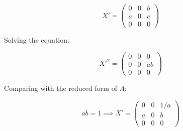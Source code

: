 \documentclass[11pt]{article}
\begin{document}
\begin{equation}
    X' = \begin{pmatrix} 0 & 0 & b  \\ a & 0 & c  \\ 0 & 0 & 0 \end{pmatrix}
\end{equation}

Solving the equation:

\begin{equation}
    X'^2 = \begin{pmatrix} 0 & 0 & 0  \\ 0 & 0 & ab  \\ 0 & 0 & 0 \end{pmatrix}
\end{equation}

Comparing with the reduced form of $A$:

\begin{equation}
    ab = 1 \implies 
    X' = \begin{pmatrix} 0 & 0 & 1 / a  \\ a & 0 & b  \\ 0 & 0 & 0 \end{pmatrix}
\end{equation}



\end{document}
